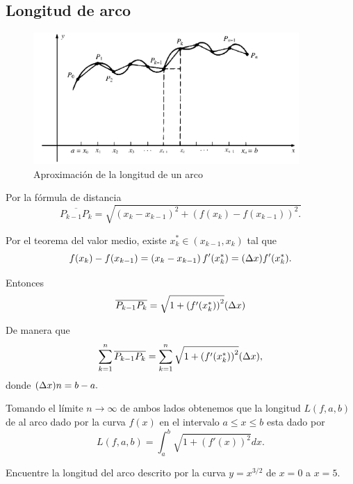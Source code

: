 \subsection{Longitud de arco}


\begin{figure}[h]
 \centering
 \includegraphics[height=5cm,keepaspectratio=true]{./calculo/fig2908.png}
 \caption{Aproximación de la longitud de un arco}
 \label{fig:2908}
\end{figure}




Por la f\'ormula de distancia
$$
\overline{P_{k-1}P_{k}}=\sqrt{
\left( x_{k}-x_{k-1} \right)^{2}+
\left( f(x_{k})-f(x_{k-1}) \right)^{2}.
}
$$


Por el teorema del valor medio, existe $x_{k}^{*}\in(x_{k-1},x_{k})$ tal que
$$
f(x_{k})-f(x_{k-1})=\left( x_{k}-x_{k-1} \right)f'(x_{k}^{*})=(\Delta x)f'(x_{k}^{*}).
$$

Entonces 
$$
\overline{P_{k-1}P_{k}}=\sqrt{1+\left( f'(x_{k}^{*}) \right)^{2}}(\Delta x)
$$



De manera que 
$$
\sum_{k=1}^{n}\overline{P_{k-1}P_{k}}=
\sum_{k=1}^{n}\sqrt{1+\left( f'(x_{k}^{*}) \right)^{2}}(\Delta x),
$$ donde $(\Delta x)n=b-a.$


Tomando el l\'imite $n \to \infty$ de ambos lados obtenemos que la longitud $L(f,a,b)$ de al arco dado por la curva $f(x)$ en el intervalo $a\leq x \leq b$ esta dado por 
\begin{equation}
 \label{29.2}
 L(f,a,b)=\int_{a}^{b}\sqrt{1+(f'(x))^{2}}dx.
\end{equation}




\begin{problema}
 Encuentre la longitud del arco descrito por la curva $y=x^{3/2}$ de $x=0$ a $x=5.$
\end{problema}




